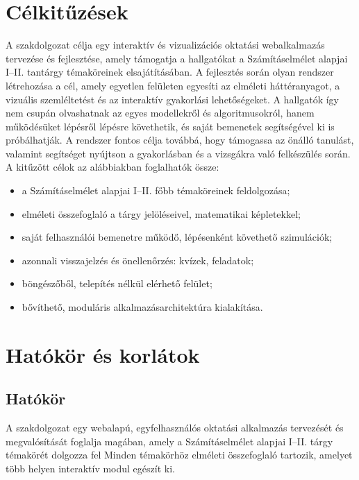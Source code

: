 \documentclass[12pt,a4paper]{report}
\begin{document}
\chapter{Célkitűzések}
A szakdolgozat célja egy interaktív és vizualizációs oktatási webalkalmazás
tervezése és fejlesztése, amely támogatja a hallgatókat a Számításelmélet
alapjai I--II. tantárgy témaköreinek elsajátításában.
A fejlesztés során olyan rendszer létrehozása a cél,
amely egyetlen felületen egyesíti az elméleti háttéranyagot, a vizuális
szemléltetést és az interaktív gyakorlási lehetőségeket. A hallgatók így
nem csupán olvashatnak az egyes modellekről és algoritmusokról, hanem
működésüket lépésről lépésre követhetik, és saját bemenetek segítségével
ki is próbálhatják.
A rendszer fontos célja továbbá, hogy támogassa az önálló tanulást,
valamint segítséget nyújtson a gyakorlásban és a vizsgákra való
felkészülés során.
A kitűzött célok az alábbiakban foglalhatók össze:

\begin{itemize}
    \item a Számításelmélet alapjai I--II. főbb témaköreinek feldolgozása;
    \item elméleti összefoglaló a tárgy jelöléseivel, matematikai képletekkel;
    \item saját felhasználói bemenetre működő, lépésenként követhető szimulációk;
    \item azonnali visszajelzés és önellenőrzés: kvízek, feladatok;
    \item böngészőből, telepítés nélkül elérhető felület;
    \item bővíthető, moduláris alkalmazásarchitektúra kialakítása.
\end{itemize}

\chapter{Hatókör és korlátok}

\section{Hatókör}

A szakdolgozat egy webalapú, egyfelhasználós oktatási alkalmazás
tervezését és megvalósítását foglalja magában, amely a Számításelmélet
alapjai I--II. tárgy témakörét dolgozza fel Minden témakörhöz elméleti összefoglaló
tartozik, amelyet több helyen interaktív modul egészít ki.
\end{document}

